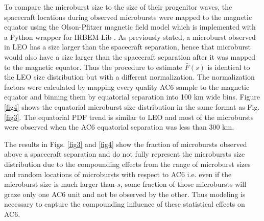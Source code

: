 \documentclass[draft]{agujournal2019}
\begin{document}
To compare the microburst size to the size of their progenitor waves, the spacecraft locations during observed microbursts were mapped to the magnetic equator using the Olson-Pfitzer magnetic field model \cite{Olson1982} which is implemented with a Python wrapper for IRBEM-Lib \cite{irbem}. As previously stated, a microburst observed in LEO has a size larger than the spacecraft separation, hence that microburst would also have a size larger than the spacecraft separation after it was mapped to the magnetic equator. Thus the procedure to estimate $\bar{F}(s)$ is identical to the LEO size distribution but with a different normalization. The normalization factors were calculated by mapping every quality AC6 sample to the magnetic equator and binning them by equatorial separation into 100 km wide bins. Figure \ref{fig4} shows the equatorial microburst size distribution in the same format as Fig. \ref{fig3}. The equatorial PDF trend is similar to LEO and most of the microbursts were observed when the AC6 equatorial separation was less than 300 km. 

The results in Figs. \ref{fig3} and \ref{fig4} show the fraction of microbursts observed above a spacecraft separation and do not fully represent the microbursts size distribution due to the compounding effects from the range of microburst sizes and random locations of microbursts with respect to AC6 i.e. even if the microburst size is much larger than $s$, some fraction of those microbursts will graze only one AC6 unit and not be observed by the other. Thus modeling is necessary to capture the compounding influence of these statistical effects on AC6.
\end{document}
